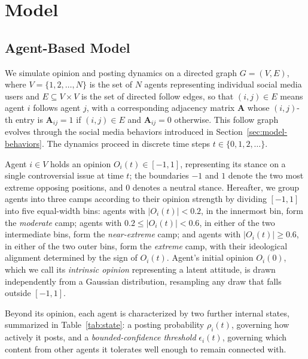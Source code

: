 \documentclass{svproc}
\def\post{\rho}                 %
\def\BoundedConfidence{\epsilon} %
\begin{document}
\section{Model}\label{sec:model}
\subsection{Agent-Based Model}\label{sec:model-abm}

We simulate opinion and posting dynamics on a directed graph
$G=(V,E)$, where $V=\{1,2,\dots,N\}$ is the set of $N$ agents
representing individual social media users and $E\subseteq V\times V$
is the set of directed follow edges, so that $(i,j)\in E$ means agent
$i$ follows agent $j$, with a corresponding adjacency matrix
$\mathbf{A}$ whose $(i, j)$-th entry is $\mathbf{A}_{ij}=1$ if
$(i,j)\in E$ and $\mathbf{A}_{ij}=0$ otherwise. This follow graph
evolves through the 
social media behaviors introduced in
Section~\ref{sec:model-behaviors}. The dynamics proceed in discrete
time steps $t\in\{0,1,2,\dots\}$.
\par

Agent $i\in V$ holds an opinion $O_i(t)\in[-1,1]$, representing
its stance on a single controversial issue at time $t$; the boundaries
$-1$ and $1$ denote the two most extreme opposing positions, and $0$
denotes a neutral stance. Hereafter, we group agents into three camps
according to their opinion strength by dividing $[-1,1]$ into five
equal-width bins: agents with $\vert O_i(t)\vert <0.2$, in the
innermost bin, form the \emph{moderate} camp; agents with
$0.2\le\vert O_i(t)\vert<0.6$, in either of the two intermediate
bins, form the \emph{near-extreme} camp; and agents with
$\vert O_i(t)\vert\ge0.6$, in either of the two outer bins, form
the \emph{extreme} camp, with their ideological alignment determined
by the sign of $O_i(t)$.
Agent's initial opinion $O_i(0)$, which
we call its \emph{intrinsic opinion} representing a latent attitude,
is drawn independently from a Gaussian distribution, resampling any
draw that falls outside $[-1,1]$.
\par


Beyond its opinion, each agent is characterized by two further
internal states, summarized in Table~\ref{tab:state}: a posting
probability $\post_i(t)$, governing how actively it posts, and a
{\em bounded-confidence threshold} $\BoundedConfidence_i(t)$, governing
which content from other agents it tolerates well enough to remain
connected with.
\par
\end{document}
